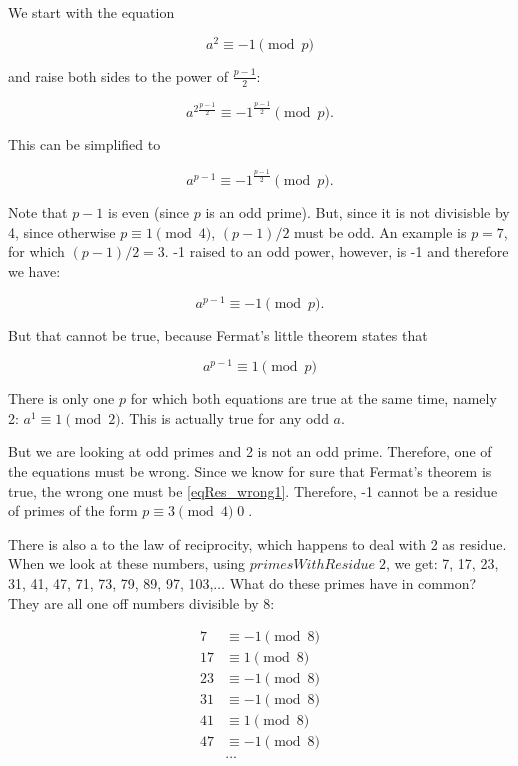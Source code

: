 \documentclass{scrreprt}
\newcommand{\Varid}[1]{\mathit{#1}}
\begin{document}
We start with the equation

\begin{equation}
a^2 \equiv -1 \pmod{p}
\end{equation}

and raise both sides to the power of $\frac{p-1}{2}$:

\begin{equation}
a^{2\frac{p-1}{2}} \equiv -1^{\frac{p-1}{2}} \pmod{p}.
\end{equation}

This can be simplified to

\begin{equation}
a^{p-1} \equiv -1^{\frac{p-1}{2}} \pmod{p}.
\end{equation} 

Note that $p-1$ is even (since $p$ is an odd prime).
But, since it is not divisisble by 4,
since otherwise $p \equiv 1 \pmod{4}$, 
$(p-1)/2$ must be odd.
An example is $p = 7$, for which $(p-1)/2 = 3$.
-1 raised to an odd power, however, is -1
and therefore we have:

\begin{equation}\label{eqRes_wrong1}
a^{p-1} \equiv -1 \pmod{p}.
\end{equation}

But that cannot be true, because Fermat's little theorem states
that 

\begin{equation}
a^{p-1} \equiv 1 \pmod{p}
\end{equation}

There is only one $p$ for which both equations
are true at the same time, namely 2:
$a^1 \equiv 1 \pmod{2}$. This is actually true
for any odd $a$.

But we are looking at odd primes and 2 is not an odd prime.
Therefore, one of the equations must be wrong.
Since we know for sure that Fermat's theorem is true,
the wrong one must be \ref{eqRes_wrong1}.
Therefore, -1 cannot be a residue of primes of the form
$p \equiv 3 \pmod{4}$\qed.

There is also a  to 
the law of reciprocity, which happens to deal
with 2 as residue. When we look at these numbers,
using \ensuremath{\Varid{primesWithResidue}\;\mathrm{2}}, we get:
7, 17, 23, 31, 41, 47, 71, 73, 79, 89, 97, 103,$\dots$
What do these primes have in common?
They are all one off numbers divisible by 8:

\begin{align*}
7  & \equiv -1 \pmod{8}\\
17 & \equiv  1 \pmod{8}\\
23 & \equiv -1 \pmod{8}\\
31 & \equiv -1 \pmod{8}\\
41 & \equiv  1 \pmod{8}\\
47 & \equiv -1 \pmod{8}\\
   & \dots
\end{align*}
\end{document}
